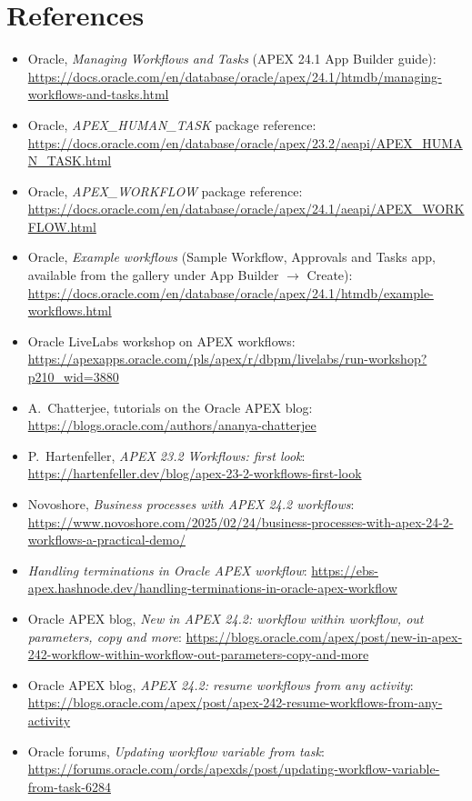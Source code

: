 \documentclass[11pt,a4paper]{article}
\begin{document}
\section{References}
\begin{itemize}
\item Oracle, \emph{Managing Workflows and Tasks} (APEX 24.1 App Builder guide): \url{https://docs.oracle.com/en/database/oracle/apex/24.1/htmdb/managing-workflows-and-tasks.html}
\item Oracle, \emph{APEX\_HUMAN\_TASK} package reference: \url{https://docs.oracle.com/en/database/oracle/apex/23.2/aeapi/APEX_HUMAN_TASK.html}
\item Oracle, \emph{APEX\_WORKFLOW} package reference: \url{https://docs.oracle.com/en/database/oracle/apex/24.1/aeapi/APEX_WORKFLOW.html}
\item Oracle, \emph{Example workflows} (Sample Workflow, Approvals and Tasks app, available from the gallery under App Builder $\rightarrow$ Create): \url{https://docs.oracle.com/en/database/oracle/apex/24.1/htmdb/example-workflows.html}
\item Oracle LiveLabs workshop on APEX workflows: \url{https://apexapps.oracle.com/pls/apex/r/dbpm/livelabs/run-workshop?p210_wid=3880}
\item A.~Chatterjee, tutorials on the Oracle APEX blog: \url{https://blogs.oracle.com/authors/ananya-chatterjee}
\item P.~Hartenfeller, \emph{APEX 23.2 Workflows: first look}: \url{https://hartenfeller.dev/blog/apex-23-2-workflows-first-look}
\item Novoshore, \emph{Business processes with APEX 24.2 workflows}: \url{https://www.novoshore.com/2025/02/24/business-processes-with-apex-24-2-workflows-a-practical-demo/}
\item \emph{Handling terminations in Oracle APEX workflow}: \url{https://ebs-apex.hashnode.dev/handling-terminations-in-oracle-apex-workflow}
\item Oracle APEX blog, \emph{New in APEX 24.2: workflow within workflow, out parameters, copy and more}: \url{https://blogs.oracle.com/apex/post/new-in-apex-242-workflow-within-workflow-out-parameters-copy-and-more}
\item Oracle APEX blog, \emph{APEX 24.2: resume workflows from any activity}: \url{https://blogs.oracle.com/apex/post/apex-242-resume-workflows-from-any-activity}
\item Oracle forums, \emph{Updating workflow variable from task}: \url{https://forums.oracle.com/ords/apexds/post/updating-workflow-variable-from-task-6284}
\end{itemize}
\end{document}
